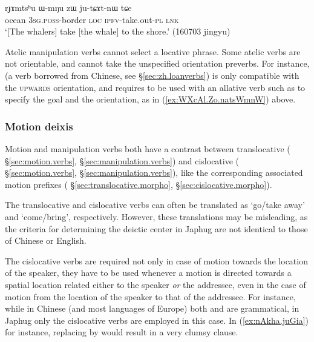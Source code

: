 \begin{exe}
\ex \label{ex:WmNu.zW.jutCAtnW}
\gll   rɟɤmtsʰu ɯ-mŋu zɯ ju-tɕɤt-nɯ tɕe \\
ocean \textsc{3sg}.\textsc{poss}-border \textsc{loc} \textsc{ipfv}-take.out-\textsc{pl} \textsc{lnk} \\
\glt `[The whalers] take [the whale] to the shore.' (160703 jingyu)
\end{exe}

Atelic manipulation verbs cannot select a locative phrase. Some atelic verbs are not orientable, and cannot take the unspecified orientation preverbs. For instance,  (a verb borrowed from Chinese, see §\ref{sec:zh.loanverbs}) is only compatible with the \textsc{upwards} orientation, and requires to be used with an allative verb such as  to specify the goal and the orientation, as in (\ref{ex:WXcAl.Zo.natsWmnW}) above.


\subsubsection{Motion deixis} \label{sec:motion.deixis}
Motion and manipulation verbs both have a contrast between translocative ( §\ref{sec:motion.verbs},  §\ref{sec:manipulation.verbs}) and cislocative ( §\ref{sec:motion.verbs},  §\ref{sec:manipulation.verbs}), like the corresponding associated motion prefixes ( §\ref{sec:translocative.morpho},  §\ref{sec:cislocative.morpho}).

The translocative and cislocative verbs can often be translated as `go/take away' and `come/bring', respectively. However, these translations may be misleading, as the criteria for determining the deictic center in Japhug are not identical to those of Chinese or English.

The cislocative verbs are required not only in case of motion towards the location of the speaker, they have to be used whenever a motion is directed towards a spatial location related either to the speaker \textit{or} the addressee, even in the case of motion from the location of the speaker to that of the addressee. For instance, while in Chinese (and most languages of Europe) both  and  are  grammatical, in Japhug only the cislocative verbs are employed in this case. In (\ref{ex:nAkha.juGia}) for instance, replacing  by  would result in a very clumsy clause.

